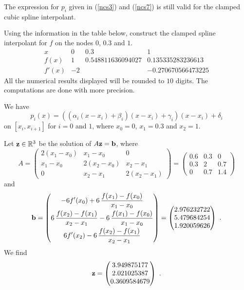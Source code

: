 The expression for $p_i$ given in (\ref{ncs3}) and (\ref{ncs7}) is
still valid for the clamped cubic spline interpolant.

\begin{egg}
Using the information in the table below, construct the clamped spline
interpolant for $f$ on the nodes $0$, $0.3$ and $1$.
\[
\begin{array}{c|ccc}
x & 0 & 0.3 & 1 \\
\hline
f(x) & 1 & 0.548811636094027 & 0.135335283236613 \\
f'(x) & -2 & & -0.270670566473225
\end{array}
\]
All the numerical results displayed will be rounded to $10$
digits.  The computations are done with more precision.

We have
\[
p_i(x) = \left(\left(\alpha_i(x-x_i) + \beta_i\right)(x-x_i)
+\gamma_i\right)(x-x_i) + \delta_i
\]
on $[x_i,x_{i+1}]$ for $i=0$ and $1$, where $x_0 = 0$, $x_1 = 0.3$ and
$x_2=1$.

Let $\mathbf{z} \in \mathbb{R}^3$ be the solution of $A\mathbf{z} = \mathbf{b}$, where
\[
A = \begin{pmatrix}
2 (x_1-x_0) & x_1-x_0 & 0 \\
x_1-x_0 & 2(x_2-x_0) & x_2-x_1 \\
0 & x_2-x_1 & 2(x_2-x_1)
\end{pmatrix}
= \begin{pmatrix}
0.6 & 0.3 & 0 \\
0.3 & 2 & 0.7 \\
0 & 0.7 & 1.4
\end{pmatrix}
\]
and
\[
\mathbf{b} = \begin{pmatrix}
\displaystyle - 6f'(x_0) + 6\, \frac{f(x_1) - f(x_0)}{x_1-x_0}\\[0.8em]
\displaystyle 6\,\frac{f(x_2) -f(x_1)}{x_2-x_1}
- 6\,\frac{f(x_1) - f(x_0)}{x_1-x_0}\\[0.8em]
\displaystyle 6f'(x_2) - 6\,\frac{f(x_2)-f(x_1)}{x_2-x_1}
\end{pmatrix}
= \begin{pmatrix}
2.976232722 \\
5.479684254 \\
1.920059626    
\end{pmatrix} \ .
\]
We find
\[
\mathbf{z} = \begin{pmatrix}
3.949875177 \\ 2.021025387 \\ 0.3609584679
\end{pmatrix} \ .
\]


\end{egg}
